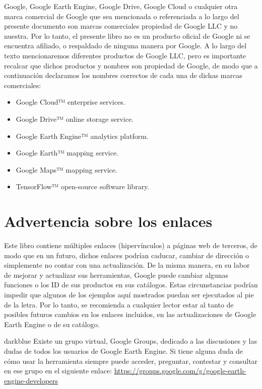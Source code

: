 \documentclass[
  12pt,
  letterpaper,
  twoside]{book}
\providecommand{\tightlist}{%
  \setlength{\itemsep}{0pt}\setlength{\parskip}{0pt}}
\begin{document}
Google, Google Earth Engine, Google Drive, Google Cloud o cualquier otra marca comercial de Google que sea mencionada o referenciada a lo largo del presente documento son marcas comerciales propiedad de Google LLC y no nuestra. Por lo tanto, el presente libro no es un producto oficial de Google ni se encuentra afiliado, o respaldado de ninguna manera por Google.
A lo largo del texto mencionaremos diferentes productos de Google LLC, pero es importante recalcar que dichos productos y nombres son propiedad de Google, de modo que a continuación declaramos los nombres correctos de cada una de dichas marcas comerciales:

\begin{itemize}
\tightlist
\item
  Google Cloud™ enterprise services.
\item
  Google Drive™ online storage service.
\item
  Google Earth Engine™ analytics platform.
\item
  Google Earth™ mapping service.
\item
  Google Maps™ mapping service.
\item
  TensorFlow™ open-source software library.
\end{itemize}

\hypertarget{advertencia-sobre-los-enlaces}{%
\chapter*{Advertencia sobre los enlaces}\label{advertencia-sobre-los-enlaces}}

Este libro contiene múltiples enlaces (hipervínculos) a páginas web de terceros, de modo que en un futuro, dichos enlaces podrían caducar, cambiar de dirección o simplemente no contar con una actualización. De la misma manera, en su labor de mejorar y actualizar sus herramientas, Google puede cambiar algunas funciones o los ID de sus productos en sus catálogos. Estas circunstancias podrían impedir que algunos de los ejemplos aquí mostrados puedan ser ejecutados al pie de la letra. Por lo tanto, se recomienda a cualquier lector estar al tanto de posibles futuros cambios en los enlaces incluidos, en las actualizaciones de Google Earth Engine o de su catálogo.

\begin{bluebox2}

\begin{awesomeblock}{5pt}{\faLightbulb}{darkblue}
Existe un grupo virtual, Google Groups, dedicado a las discusiones y las dudas de todos los usuarios de Google Earth Engine. Si tiene alguna duda de cómo usar la herramienta siempre puede acceder, preguntar, contestar y consultar en ese grupo en el siguiente enlace: \url{https://groups.google.com/g/google-earth-engine-developers}

\end{awesomeblock}

\end{bluebox2}
\end{document}
